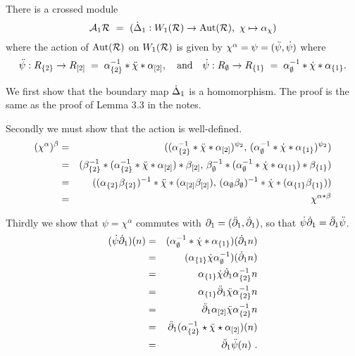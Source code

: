 \begin{lem} 
There is a crossed module
$$
\mathcal{A}_1{\mathcal{R}} ~=~ (\dot{\Delta}_1 : W_1(\mathcal{R}) \to \mathrm{Aut}(\mathcal{R}), ~
\chi \mapsto \alpha_{\chi})
$$
where the action of $\mathrm{Aut}(\mathcal{R})$ on $W_1(\mathcal{R})$ is given by
$\chi^{\alpha} = \psi = (\ddot{\psi}, \dot{\psi})$
where 
$$ 
\ddot{\psi} : R_{\{2\}} \to R_{[2]}  \;=\; \alpha_{\{2\}}^{-1} * \ddot{\chi} * \alpha_{[2]},
\quad \mbox{and} \quad  
\dot{\psi} : R_{\emptyset} \to R_{\{1\}}  \;=\; 
\alpha_{\emptyset}^{-1} * \dot{\chi} * \alpha_{\{1\}}.
$$
\end{lem}
\begin{pf}
We first show that the boundary map $\dot{\Delta}_1$ is a homomorphism.
The proof is the same as the proof of Lemma 3.3 in the notes.

Secondly we must show that the action is well-defined.
\begin{eqnarray*}
(\chi^{\alpha})^{\beta} 
  & = & ((\alpha_{\{2\}}^{-1} * \ddot{\chi} * \alpha_{[2]})^{\psi_2}, \,  
        (\alpha_{\emptyset}^{-1} * \dot{\chi} * \alpha_{\{1\}})^{\psi_2})  \\
  & = & (\beta_{\{2\}}^{-1} * (\alpha_{\{2\}}^{-1} * \ddot{\chi} 
        * \alpha_{[2]}) * \beta_{[2]},\,
         \beta_{\emptyset}^{-1} * (\alpha_{\emptyset}^{-1} * \dot{\chi} 
        * \alpha_{\{1\}}) * \beta_{\{1\}} )\\
  & = & ((\alpha_{\{2\}} \beta_{\{2\}})^{-1} * \ddot{\chi} 
        * (\alpha_{[2]} \beta_{[2]}), \,  
         (\alpha_{\emptyset} \beta_{\emptyset})^{-1} * \dot{\chi} 
        * (\alpha_{\{1\}} \beta_{\{1\}})) \\
  & = & \chi^{\alpha*\beta}
\end{eqnarray*}

Thirdly we show that $\psi = \chi^{\alpha}$ commutes with 
$\partial_1 = (\ddot{\partial}_1,\dot{\partial}_1)$, so that  $\dot{\psi} \dot{\partial}_1 = \ddot{\partial}_1 \ddot{\psi}$.
\begin{eqnarray*}
(\dot{\psi} \dot{\partial}_1)(n) 
  & = & (\alpha_{\emptyset}^{-1} * \dot{\chi} * \alpha_{\{1\}})(\dot{\partial}_1 n) \\
  & = & (\alpha_{\{1\}} \dot{\chi} \alpha_{\emptyset}^{-1})(\dot{\partial}_1 n) \\
  & = & \alpha_{\{1\}} \dot{\chi} \dot{\partial}_1 \alpha_{\{2\}}^{-1} n \\
  & = & \alpha_{\{1\}} \ddot{\partial}_1 \ddot{\chi} \alpha_{\{2\}}^{-1} n \\
  & = & \ddot{\partial}_1 \alpha_{[2]} \ddot{\chi} \alpha_{\{2\}}^{-1} n \\
  & = & \ddot{\partial}_1(\alpha_{\{2\}}^{-1} \star \ddot{\chi} \star \alpha_{[2]})(n) \\
  & = & \ddot{\partial}_1 \ddot{\psi} (n)~. \\
\end{eqnarray*}


\end{pf}
